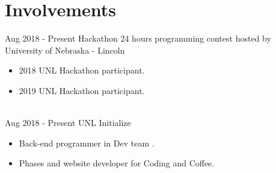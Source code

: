 \documentclass[letterpaper]{twentysecondcv} %
\begin{document}

\section{Involvements}
\begin{twenty}
	
    \twentyitem
    	{Aug 2018 - }
		{Present}
        {Hackathon}
        {}
        {24 hours programming contest hosted by University of Nebraska - Lincoln}
        {
        {\begin{itemize}
        \item 2018 UNL Hackathon participant.
        \item 2019 UNL Hackathon participant.
		\end{itemize}}
        }
    \\
    \twentyitem
    	{Aug 2018 -}
		{Present}
        {UNL Initialize}
        {}
        {}
        {
        {\begin{itemize}
        \item Back-end programmer in Dev team .
        \item Phases and website developer for Coding and Coffee.
		\end{itemize}}
        }
\end{twenty}
\end{document}
